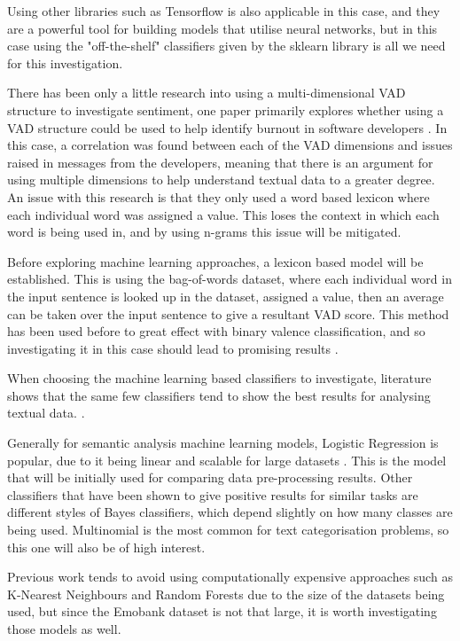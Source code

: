 Using other libraries such as Tensorflow is also applicable in this case,  and they are a powerful tool for building models that utilise neural networks, but in this case using the "off-the-shelf" classifiers given by the sklearn library is all we need for this investigation.

There has been only a little research into using a multi-dimensional VAD structure to investigate sentiment, one paper primarily explores whether using a VAD structure could be used to help identify burnout in software developers \cite{mantyla2016mining}. In this case, a correlation was found between each of the VAD dimensions and issues raised in messages from the developers, meaning that there is an argument for using multiple dimensions to help understand textual data to a greater degree. An issue with this research is that they only used a word based lexicon where each individual word was assigned a value. This loses the context in which each word is being used in, and by using n-grams this issue will be mitigated.


Before exploring machine learning approaches, a lexicon based model will be established. This is using the bag-of-words dataset, \cite{wordsData} where each individual word in the input sentence is looked up in the dataset, assigned a value, then an average can be taken over the input sentence to give a resultant VAD score. This method has been used before to great effect with binary valence classification, and so investigating it in this case should lead to promising results \cite{kolchyna2015twitter}.

When choosing the machine learning based classifiers to investigate, literature shows that the same few classifiers tend to show the best results for analysing textual data.\cite{kolchyna2015twitter} \cite{frank2006naive}.

Generally for semantic analysis machine learning models, Logistic Regression is popular, due to it being linear and scalable for large datasets \cite{towardsDS}. This is the model that will be initially used for comparing data pre-processing results.
Other classifiers that have been shown to give positive results for similar tasks are different styles of Bayes classifiers,  which depend slightly on how many classes are being used. Multinomial is the most common for text categorisation problems, so this one will also be of high interest. \cite{frank2006naive}

Previous work tends to avoid using computationally expensive approaches such as K-Nearest Neighbours and Random Forests due to the size of the datasets being used, but since the Emobank dataset is not that large, it is worth investigating those models as well.

